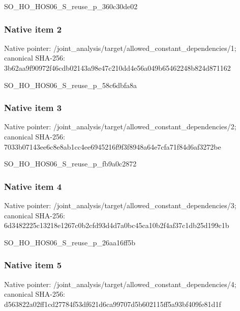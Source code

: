 \documentclass[10pt,a4paper]{article}
\begin{document}
\begingroup\raggedright\sloppy SO\_\allowbreak{}HO\_\allowbreak{}HOS06\_\allowbreak{}S\_\allowbreak{}reuse\_\allowbreak{}p\_\allowbreak{}360c30de02\par\endgroup

\subsubsection{Native item 2}
Native pointer: /joint\_\allowbreak{}analysis/target/allowed\_\allowbreak{}constant\_\allowbreak{}dependencies/1; canonical SHA-256: 3b62aa9f90972f46cdb02143a98e47c210dd4e56a049b65462248b824d871162

\begingroup\raggedright\sloppy SO\_\allowbreak{}HO\_\allowbreak{}HOS06\_\allowbreak{}S\_\allowbreak{}reuse\_\allowbreak{}p\_\allowbreak{}58c6dbfa8a\par\endgroup

\subsubsection{Native item 3}
Native pointer: /joint\_\allowbreak{}analysis/target/allowed\_\allowbreak{}constant\_\allowbreak{}dependencies/2; canonical SHA-256: 7033b07143ee6c8e8ab1cc4ee6945216f9f3f8948a64e7cfa71f84d6af3272be

\begingroup\raggedright\sloppy SO\_\allowbreak{}HO\_\allowbreak{}HOS06\_\allowbreak{}S\_\allowbreak{}reuse\_\allowbreak{}p\_\allowbreak{}fb9a0c2872\par\endgroup

\subsubsection{Native item 4}
Native pointer: /joint\_\allowbreak{}analysis/target/allowed\_\allowbreak{}constant\_\allowbreak{}dependencies/3; canonical SHA-256: 6d3482225c13218e1267c0b2cfd93d4d7a0bc45ca10b2f4af37c1db25d199c1b

\begingroup\raggedright\sloppy SO\_\allowbreak{}HO\_\allowbreak{}HOS06\_\allowbreak{}S\_\allowbreak{}reuse\_\allowbreak{}p\_\allowbreak{}26aa16ff5b\par\endgroup

\subsubsection{Native item 5}
Native pointer: /joint\_\allowbreak{}analysis/target/allowed\_\allowbreak{}constant\_\allowbreak{}dependencies/4; canonical SHA-256: d563822a02ff1cd27784f53df621d6ca99707d5b602115ff5a93bf409fe81d1f
\end{document}
